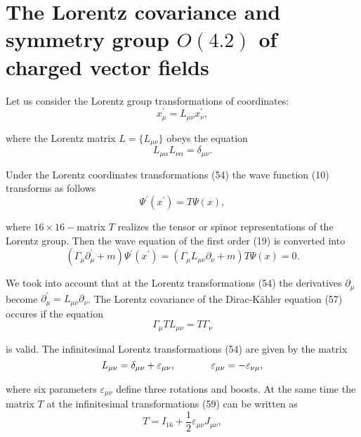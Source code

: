 \documentclass[a4paper,12pt]{article}
\begin{document}
\section{The Lorentz covariance and symmetry group $O(4.2)$ of
charged vector fields}

Let us consider the Lorentz group transformations of coordinates:
\begin{equation}
x_\mu ^{\prime }=L_{\mu \nu }x_\nu ^{\prime } , \label{54}
\end{equation}

where the Lorentz matrix $L=\{L_{\mu \nu }\}$ obeys the equation
\begin{equation}
L_{\mu \alpha }L_{\nu \alpha }=\delta _{\mu \nu } . \label{55}
\end{equation}

Under the Lorentz coordinates transformations (54) the wave function (10)
transforms as follows
\begin{equation}
\Psi ^{\prime }(x^{\prime })=T\Psi (x) , \label{56}
\end{equation}

where $16\times 16-$matrix $T$ realizes the tensor or spinor representations
of the Lorentz group. Then the wave equation of the first order (19) is
converted into
\begin{equation}
\left( \Gamma _\mu \partial _\mu ^{\prime }+m\right) \Psi ^{\prime
}(x^{\prime })=\left( \Gamma _\mu L_{\mu \nu }\partial _\nu
+m\right) T\Psi (x)=0 . \label{57}
\end{equation}

We took into account that at the Lorentz transformations (54) the
derivatives $\partial _\mu $ become $\partial _\mu ^{\prime }=L_{\mu \nu
}\partial _\nu $. The Lorentz covariance of the Dirac-K\"ahler equation (57)
occures if the equation
\begin{equation}
\Gamma _\mu TL_{\mu \nu }=T\Gamma _\nu  \label{58}
\end{equation}

is valid. The infinitesimal Lorentz transformations (54) are given by the
matrix
\begin{equation}
L_{\mu \nu }=\delta _{\mu \nu }+\varepsilon _{\mu \nu } ,
\hspace{0.5in} \varepsilon _{\mu \nu }=-\varepsilon _{\nu \mu } ,
\label{59}
\end{equation}

where six parameters $\varepsilon _{\mu \nu }$ define three rotations and
boosts. At the same time the matrix $T$ at the infinitesimal transformations
(59) can be written as
\begin{equation}
T=I_{16}+\frac 12\varepsilon _{\mu \nu }J_{\mu \nu } , \label{60}
\end{equation}
\end{document}
